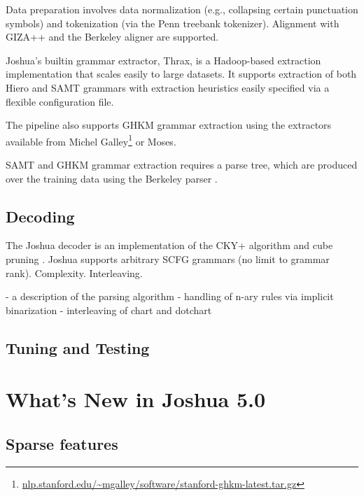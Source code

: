 \documentclass[11pt]{article}
\begin{document}
Data preparation involves data normalization (e.g., collapsing certain
punctuation symbols) and tokenization (via the Penn treebank
tokenizer).  Alignment with GIZA++ \cite{giza} and the Berkeley aligner
\cite{berkeley-aligner} are supported.

Joshua's builtin grammar extractor, Thrax, is a Hadoop-based
extraction implementation that scales easily to large datasets. It
supports extraction of both Hiero \cite{Chiang2005} and SAMT grammars
\cite{samt2006} with extraction heuristics easily specified via a
flexible configuration file.

The pipeline also supports GHKM grammar extraction \cite{galley2006scalable} using the
extractors available from Michel
Galley\footnote{\url{nlp.stanford.edu/~mgalley/software/stanford-ghkm-latest.tar.gz}}
or Moses.

SAMT and GHKM grammar extraction requires a parse tree, which are
produced over the training data using the Berkeley parser \cite{petrov2006learning}.

\subsection{Decoding}

The Joshua decoder is an implementation of the CKY+ algorithm
\cite{chappelier1998generalized} and cube pruning
\cite{Chiang2007}. Joshua supports arbitrary SCFG grammars (no limit
to grammar rank). Complexity. Interleaving.

- a description of the parsing algorithm 
- handling of n-ary rules via implicit binarization
- interleaving of chart and dotchart

\subsection{Tuning and Testing}



\section{What's New in Joshua 5.0}

\subsection{Sparse features}
\end{document}
